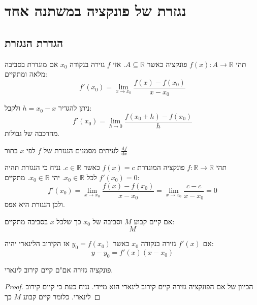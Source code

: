 \documentclass{tstextbook}
\begin{document}
\chapter{נגזרת של פונקציה במשתנה אחד}

\section{הגדרת הנגזרת}

\begin{definition}
תהי \(f(x):A\to \mathbb{R}\) פונקציה כאשר \(A\subseteq \mathbb{R}\). אזי \(f\) גזירה בנקודה \(x_{0}\) אם מוגדרת בסביבה מלאה ומתקיים:
$$f'(x_{0})= \lim_{ x \to x_{0} } \frac{f(x)-f(x_{0})}{x-x_{0}}$$

\end{definition}
\begin{corollary}
ניתן להגדיר \(h=x_{0}-x\) ולקבל:
$$f'(x_{0})=\lim_{ h \to 0 } \frac{f(x_{0}+h)-f(x_{0})}{h}$$
מהרכבה של גבולות.

\end{corollary}
\begin{symbolize}
לעיתים מסמנים הנגזרת של \(f\) לפי \(x\) בתור \(\frac{\mathrm{d} f}{\mathrm{d} x}\)

\end{symbolize}
\begin{example}
תהי \(f:\mathbb{R}\to \mathbb{R}\) פונקציה המוגדרת \(f(x)=c\) כאשר \(c \in \mathbb{R}\). נניח כי הנגזרת תהיה \(f'(x_{0})=0\) לכל \(x_{0} \in \mathbb{R}\). יהי \(x_{0} \in \mathbb{R}\). מתקיים:
$$f'(x_{0})= \lim_{ x \to x_{0} } \frac{f(x)-f(x_{0})}{x-x_{0}} = \lim_{ x \to x_{0} } \frac{c-c}{x-x_{0}}=0$$
ולכן הנגזרת היא אפס.

\end{example}
\begin{definition}
אם קיים קבוע \(M\) וסביבה של \(x_{0}\) כך שלכל \(x\) בסביבה מתקיים:
$$M$$

\end{definition}
\begin{proposition}
אם \(f'(x)\) גזירה בנקודה \(x_{0}\) כאשר \(y_{0}=f(x_{0})\) אז הקירוב הלינארי יהיה:
$$y-y_{0}=f'(x)(x-x_{0})$$

\end{proposition}
\begin{proposition}
פונקציה גזירה אם"ם קיים קירוב לינארי.

\end{proposition}
\begin{proof}
הכיוון של אם הפונקציה גזירה קיים קירוב לינארי הוא מיידי. נניח כעת כי קיים קירוב לינארי. כלומר קיים קבוע \(M\) כך

\end{proof}
\end{document}
